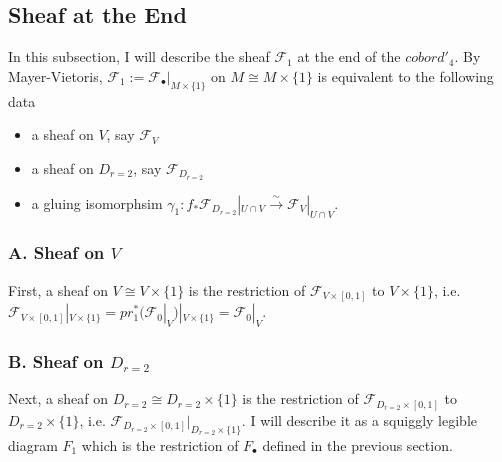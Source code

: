 \subsection{Sheaf at the End}
In this subsection, I will describe the sheaf $\mathscr{F}_1$ at the end of the $cobord'_4$. By Mayer-Vietoris, $\mathscr{F}_1:= \mathscr{F}_\bullet|_{M\times\{1\}}$ on $M \cong M\times\{1\}$ is equivalent to the following data
\begin{itemize}
\item a sheaf on $V$, say $\mathscr{F}_{V}$

\item a sheaf on $D_{r=2}$, say $\mathscr{F}_{D_{r=2}}$

\item a gluing isomorphsim $\gamma_1 : f_*\mathscr{F}_{D_{r=2}}|_{U\cap V} \xrightarrow{\sim} \mathscr{F}_{V}|_{U\cap V}$.
\end{itemize}

\subsubsection{A. Sheaf on $V$}
First, a sheaf on $V\cong V\times\{1\}$ is the restriction of $\mathscr{F}_{V\times [0,1]}$ to $V\times \{1\}$, i.e. $\mathscr{F}_{V\times [0,1]}|_{V\times \{1\}}= pr_1^*(\mathscr{F}_0|_V)|_{V\times \{1\}} = \mathscr{F}_0|_V$.
\subsubsection{B. Sheaf on $D_{r=2}$}
Next, a sheaf on $D_{r=2}\cong D_{r=2}\times \{1\}$ is the restriction of $\mathscr{F}_{D_{r=2}\times [0,1]}$ to $D_{r=2}\times \{1\}$, i.e. $\mathscr{F}_{D_{r=2}\times [0,1]} |_{D_{r=2}\times \{1\}}$. I will describe it as a squiggly legible diagram $F_1$ which is the restriction of $F_\bullet$ defined in the previous section.


